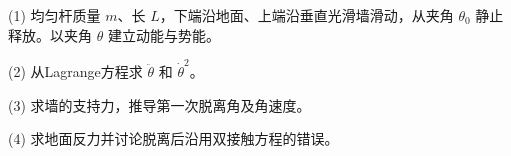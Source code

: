 (1) 均匀杆质量 \(m\)、长 \(L\)，下端沿地面、上端沿垂直光滑墙滑动，从夹角 \(\theta_0\) 静止释放。以夹角 \(\theta\) 建立动能与势能。

(2) 从Lagrange方程求 \(\ddot\theta\) 和 \(\dot\theta^2\)。

(3) 求墙的支持力，推导第一次脱离角及角速度。

(4) 求地面反力并讨论脱离后沿用双接触方程的错误。
